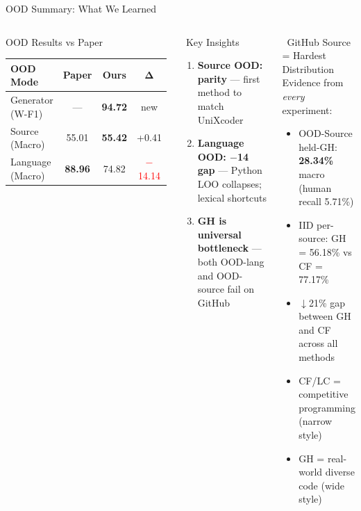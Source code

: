 \documentclass[aspectratio=169, 10pt]{beamer}
\begin{document}
\begin{frame}{OOD Summary: What We Learned}
\vspace{-0.1cm}
\begin{columns}[T]
\begin{alertblock}{OOD Results vs Paper}
\centering\footnotesize
\begin{tabular}{lccc}
\toprule
\textbf{OOD Mode} & \textbf{Paper} & \textbf{Ours} & $\boldsymbol{\Delta}$ \\
\midrule
Generator (W-F1) & --- & \textbf{94.72} & new \\
\rowcolor{oursgreen}
Source (Macro) & 55.01 & \textbf{55.42} & \textcolor{softgreen}{+0.41} \\
\rowcolor{accentred!10}
Language (Macro) & \textbf{88.96} & 74.82 & \textcolor{red}{$-$14.14} \\
\bottomrule
\end{tabular}
\end{alertblock}

\begin{exampleblock}{\faLightbulb\ Key Insights}
\small
\begin{enumerate}\setlength\itemsep{3pt}
    \item \textbf{Source OOD: parity} --- first method to match UniXcoder
    \item \textbf{Language OOD: $-$14 gap} --- Python LOO collapses; lexical shortcuts
    \item \textbf{GH is universal bottleneck} --- both OOD-lang and OOD-source fail on GitHub
\end{enumerate}
\end{exampleblock}

\begin{block}{\faExclamationTriangle\ GitHub Source = Hardest Distribution}
\small
Evidence from \emph{every} experiment:
\begin{itemize}\setlength\itemsep{3pt}
    \item OOD-Source held-GH: \textbf{28.34\%} macro (human recall 5.71\%)
    \item IID per-source: GH = 56.18\% vs CF = 77.17\%
    \item $\downarrow$21\% gap between GH and CF across all methods
    \item CF/LC = competitive programming (narrow style)
    \item GH = real-world diverse code (wide style)
\end{itemize}

\vspace{3pt}
\centering
{}
\end{block}
\end{columns}
\end{frame}
\end{document}
